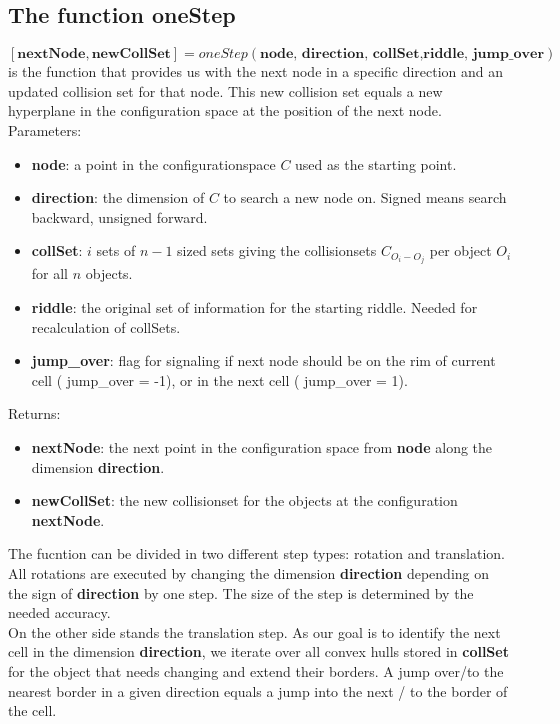 \subsection{The function oneStep}
$[\textbf{nextNode}, \textbf{newCollSet} ]=oneStep(\textbf{node, direction, collSet,riddle, jump\_over})$ is the function that provides us with the next node in a specific direction and an updated collision set for that node. This new collision set equals a new hyperplane in the configuration space at the position of the next node.\\
Parameters:
\begin{itemize}
\item \textbf{node}: a point in the configurationspace $C$ used as the starting point.
\item \textbf{direction}: the dimension of $C$ to search a new node on. Signed means search backward, unsigned forward. 
\item \textbf{collSet}: $i$ sets of $n-1$ sized sets giving the collisionsets $C_{O_i-O_j}$ per object $O_i$ for all $n$ objects.
\item \textbf{riddle}: the original set of information for the starting riddle. Needed for recalculation of collSets.
\item \textbf{jump\_over}: flag for signaling if next node should be on the rim of current cell ( jump\_over = -1), or in the next cell ( jump\_over = 1).
\end{itemize}
Returns:
\begin{itemize}
\item \textbf{nextNode}: the next point in the configuration space from \textbf{node} along the dimension \textbf{direction}.
\item \textbf{newCollSet}: the new collisionset for the objects at the configuration \textbf{nextNode}.
\end{itemize}
The fucntion can be divided in two different step types: rotation and translation. \\
All rotations are executed by changing the dimension \textbf{direction}  depending on the sign of \textbf{direction} by one step. The size of the step is determined by the needed accuracy. \\
On the other side stands the translation step. As our goal is to identify the next cell in the dimension \textbf{direction}, we iterate over all convex hulls stored in \textbf{collSet} for the object that needs changing and extend their borders. A jump over/to the nearest border in a given direction equals a jump into the next / to the border of the cell.\\
